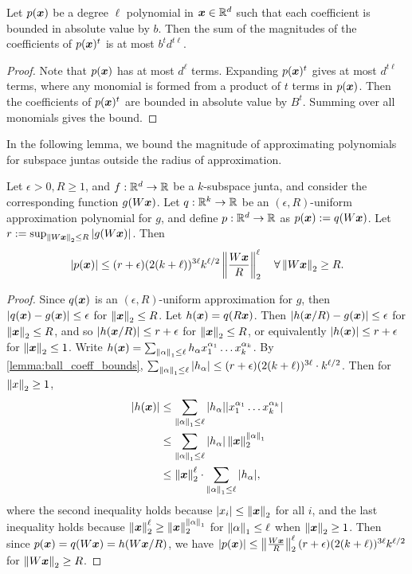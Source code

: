 \begin{lemma}\label{lemma:sum_coeff_bound}
    Let $p({\bm{x}})$ be a degree $\ell$ polynomial in ${\bm{x}} \in \mathbb{R}^d$ such that each coefficient is bounded in absolute value by $b$. Then the sum of the magnitudes of the coefficients of $p({\bm{x}})^t$ is at most $b^t d^{t \ell}$.
\end{lemma}
\begin{proof}
    Note that $p({\bm{x}})$ has at most $d^\ell$ terms. Expanding $p({\bm{x}})^t$ gives at most $d^{t \ell}$ terms, where any monomial is formed from a product of $t$ terms in $p({\bm{x}})$. Then the coefficients of $p({\bm{x}})^t$ are bounded in absolute value by $B^t$. Summing over all monomials gives the bound.
\end{proof}

In the following lemma, we bound the magnitude of approximating polynomials for subspace juntas outside the radius of approximation.
\begin{lemma}\label{lemma:bound-on-uniform-approximator-outside-interval}
    Let $\epsilon > 0, R \ge 1$, and $f: \mathbb{R}^d \rightarrow \mathbb{R}$ be a $k$-subspace junta, and consider the corresponding function $g(W{\bm{x}})$. Let $q: \mathbb{R}^k \rightarrow \mathbb{R}$ be an $(\epsilon, R)$-uniform approximation polynomial for $g$, and define $p: \mathbb{R}^d \rightarrow \mathbb{R}$ as $p({\bm{x}}) := q(W{\bm{x}})$. Let $r := \sup_{\left\| W{\bm{x}} \right\|_2 \le R} |g(W{\bm{x}})|$. Then
    \[|p({\bm{x}})| \le (r + \epsilon)(2(k+\ell))^{3\ell}k^{\ell/2} \left\| \frac{W{\bm{x}}}{R} \right\|_2^\ell \quad \forall \left\| W{\bm{x}} \right\|_2 \ge R.\]
\end{lemma}
\begin{proof}
    Since $q({\bm{x}})$ is an $(\epsilon, R)$-uniform approximation for $g$, then $|q({\bm{x}}) - g({\bm{x}})| \le \epsilon$ for $\left\| {\bm{x}} \right\|_2 \le R$. Let $h({\bm{x}}) = q(R{\bm{x}})$. Then $|h({\bm{x}}/R) - g({\bm{x}})| \le \epsilon$ for $\left\| {\bm{x}} \right\|_2 \le R$, and so $|h({\bm{x}}/R)| \le r + \epsilon$ for $\left\| {\bm{x}} \right\|_2 \le R$, or equivalently $|h({\bm{x}})| \le r + \epsilon$ for $\left\| {\bm{x}} \right\|_2 \le 1$. Write $h({\bm{x}}) = \sum_{\left\| \alpha \right\|_1 \le \ell} h_\alpha x_1^{\alpha_1}\ldots x_k^{\alpha_k}$. By \cref{lemma:ball_coeff_bounds}, $\sum_{\left\| \alpha \right\|_1 \le \ell} |h_\alpha| \le (r + \epsilon)(2(k+\ell))^{3\ell} \cdot k^{\ell/2}$. Then for $\left\| x \right\|_2 \ge 1$,
    \begin{align*}
        |h({\bm{x}})| &\le \sum_{\left\| \alpha \right\|_1 \le \ell} |h_\alpha| |x_1^{\alpha_1}\ldots x_k^{\alpha_k}| \\
        &\le \sum_{\left\| \alpha \right\|_1 \le \ell} |h_\alpha| \left\| {\bm{x}} \right\|_2^{\left\| \alpha \right\|_1} \\
        &\le \left\| {\bm{x}} \right\|_2^\ell \cdot \sum_{\left\| \alpha \right\|_1 \le \ell} |h_\alpha|, 
    \end{align*}
    where the second inequality holds because $|x_i| \le \left\| {\bm{x}} \right\|_2$ for all $i$, and the last inequality holds because $\left\| {\bm{x}} \right\|_2^\ell \ge \left\| {\bm{x}} \right\|_2^{\left\| \alpha \right\|_1}$ for $\left\| \alpha \right\|_1 \le \ell$ when $\left\| {\bm{x}} \right\|_2 \ge 1$.
    Then since $p({\bm{x}}) = q(W{\bm{x}}) = h(W{\bm{x}}/R)$, we have $|p({\bm{x}})| \le \left\| \frac{W{\bm{x}}}{R} \right\|_2^\ell (r + \epsilon)(2(k+\ell))^{3\ell} k^{\ell/2}$ for $\left\| W{\bm{x}} \right\|_2 \ge R$.
\end{proof}

